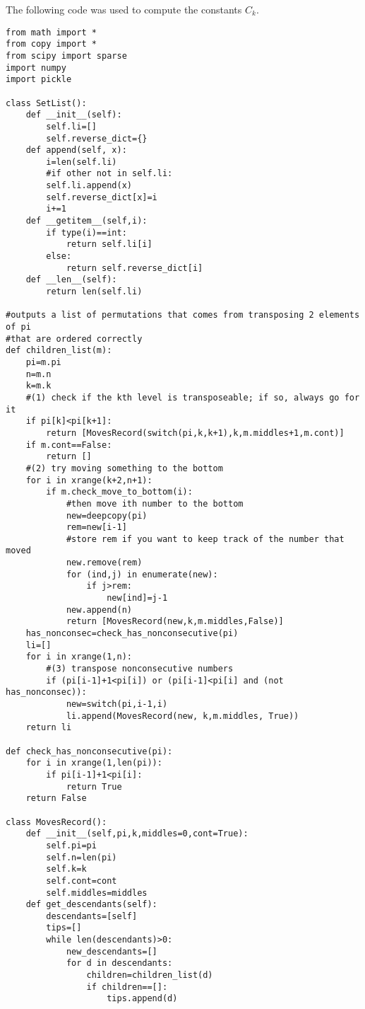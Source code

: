 \documentclass[12pt, reqno]{amsart}
\begin{document}
The following code was used to compute the constants $C_k$.
\begin{lstlisting}
from math import *
from copy import *
from scipy import sparse
import numpy
import pickle

class SetList():
    def __init__(self):
        self.li=[]
        self.reverse_dict={}
    def append(self, x):
        i=len(self.li)
        #if other not in self.li:
        self.li.append(x)
        self.reverse_dict[x]=i
        i+=1
    def __getitem__(self,i):
        if type(i)==int:
            return self.li[i]
        else:
            return self.reverse_dict[i]
    def __len__(self):
        return len(self.li)

#outputs a list of permutations that comes from transposing 2 elements of pi
#that are ordered correctly
def children_list(m):
    pi=m.pi
    n=m.n
    k=m.k
    #(1) check if the kth level is transposeable; if so, always go for it
    if pi[k]<pi[k+1]:
        return [MovesRecord(switch(pi,k,k+1),k,m.middles+1,m.cont)]
    if m.cont==False:
        return []
    #(2) try moving something to the bottom
    for i in xrange(k+2,n+1):
        if m.check_move_to_bottom(i):
            #then move ith number to the bottom
            new=deepcopy(pi)
            rem=new[i-1]
            #store rem if you want to keep track of the number that moved
            new.remove(rem)
            for (ind,j) in enumerate(new):
                if j>rem:
                    new[ind]=j-1
            new.append(n)
            return [MovesRecord(new,k,m.middles,False)]
    has_nonconsec=check_has_nonconsecutive(pi)
    li=[]
    for i in xrange(1,n):
        #(3) transpose nonconsecutive numbers
        if (pi[i-1]+1<pi[i]) or (pi[i-1]<pi[i] and (not has_nonconsec)):
            new=switch(pi,i-1,i)
            li.append(MovesRecord(new, k,m.middles, True))
    return li

def check_has_nonconsecutive(pi):
    for i in xrange(1,len(pi)):
        if pi[i-1]+1<pi[i]:
            return True
    return False

class MovesRecord():
    def __init__(self,pi,k,middles=0,cont=True):
        self.pi=pi
        self.n=len(pi)
        self.k=k
        self.cont=cont
        self.middles=middles
    def get_descendants(self):
        descendants=[self]
        tips=[]
        while len(descendants)>0:
            new_descendants=[]
            for d in descendants:
                children=children_list(d)
                if children==[]:
                    tips.append(d)
                    

\end{lstlisting}
\end{document}
